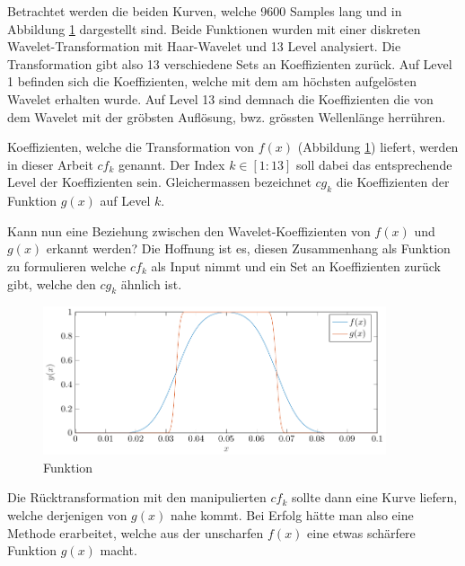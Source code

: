 Betrachtet werden die beiden Kurven, welche 9600 Samples lang und in Abbildung \ref{deconvolve:1d} dargestellt sind.
Beide Funktionen wurden mit einer diskreten Wavelet-Transformation mit Haar-Wavelet und 13 Level analysiert.
Die Transformation gibt also 13 verschiedene Sets an Koeffizienten zurück.
Auf Level 1 befinden sich die Koeffizienten, welche mit dem am höchsten aufgelösten Wavelet erhalten wurde.
Auf Level 13 sind demnach die Koeffizienten die von dem Wavelet mit der gröbsten Auflösung, bwz. grössten \glqq Wellenlänge \grqq{} herrühren.

Koeffizienten, welche die Transformation von $f(x)$ (Abbildung \ref{deconvolve:1d}) liefert, werden in dieser Arbeit $cf_k$ genannt.
Der Index $k\in[1:13]$ soll dabei das entsprechende Level der Koeffizienten sein.
Gleichermassen bezeichnet $cg_k$ die Koeffizienten der Funktion $g(x)$ auf Level $k$.

Kann nun eine Beziehung zwischen den Wavelet-Koeffizienten von $f(x)$ und $g(x)$ erkannt werden?
Die Hoffnung ist es, diesen Zusammenhang als Funktion zu formulieren welche $cf_k$ als Input nimmt und ein Set an Koeffizienten zurück gibt, welche den $cg_k$ ähnlich ist.
\begin{figure}[h]
\centering
\includegraphics[width=0.9\textwidth]{./papers/deconvolve/pictures/1d.pdf}
\caption{Funktion\label{deconvolve:1d}}
\end{figure}

Die Rücktransformation mit den manipulierten $cf_k$ sollte dann eine Kurve liefern, welche derjenigen von $g(x)$ nahe kommt.
Bei Erfolg hätte man also eine Methode erarbeitet, welche aus der \glqq unscharfen\grqq{} $f(x)$ eine etwas \glqq schärfere\grqq{} Funktion $g(x)$ macht. 

